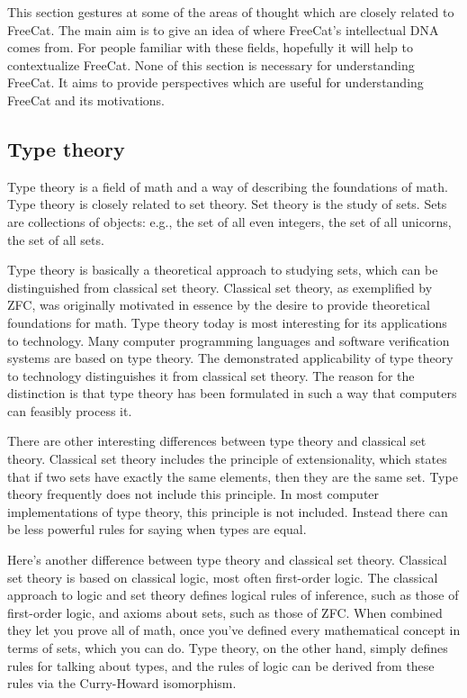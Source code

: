 \documentclass{article}
\begin{document}
This section gestures at some of the areas of thought which are closely related to FreeCat. The main aim is to give an idea of where FreeCat's intellectual DNA comes from. For people familiar with these fields, hopefully it will help to contextualize FreeCat. None of this section is necessary for understanding FreeCat. It aims to provide perspectives which are useful for understanding FreeCat and its motivations.

\subsection{Type theory}

Type theory is a field of math and a way of describing the foundations of math. Type theory is closely related to set theory. Set theory is the study of sets. Sets are collections of objects: e.g., the set of all even integers, the set of all unicorns, the set of all sets.

Type theory is basically a theoretical approach to studying sets, which can be distinguished from classical set theory. Classical set theory, as exemplified by ZFC, was originally motivated in essence by the desire to provide theoretical foundations for math. Type theory today is most interesting for its applications to technology. Many computer programming languages and software verification systems are based on type theory. The demonstrated applicability of type theory to technology distinguishes it from classical set theory. The reason for the distinction is that type theory has been formulated in such a way that computers can feasibly process it.

There are other interesting differences between type theory and classical set theory. Classical set theory includes the principle of extensionality, which states that if two sets have exactly the same elements, then they are the same set. Type theory frequently does not include this principle. In most computer implementations of type theory, this principle is not included. Instead there can be less powerful rules for saying when types are equal.

Here’s another difference between type theory and classical set theory. Classical set theory is based on classical logic, most often first-order logic. The classical approach to logic and set theory defines logical rules of inference, such as those of first-order logic, and axioms about sets, such as those of ZFC. When combined they let you prove all of math, once you've defined every mathematical concept in terms of sets, which you can do. Type theory, on the other hand, simply defines rules for talking about types, and the rules of logic can be derived from these rules via the Curry-Howard isomorphism.
\end{document}
